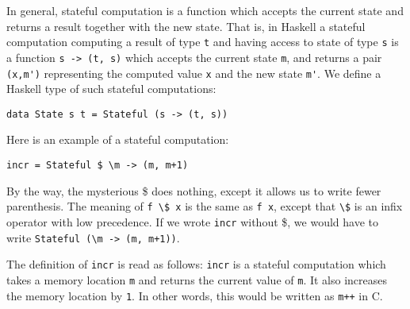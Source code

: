 \documentclass[a4paper,10pt]{article}
\newcommand{\cc}[1]{\lstinline{#1}}
\begin{document}
In general, stateful computation is a function which accepts the current state
and returns a result together with the new state. That is, in Haskell a
stateful computation computing a result of type \cc{t} and having access to
state of type \cc{s} is a function \cc{s -> (t, s)} which accepts the current
state \cc{m}, and returns a pair \cc{(x,m')} representing the computed value
\cc{x} and the new state \cc{m'}.
% 
We define a Haskell type of such stateful computations:
% 
\begin{lstlisting}
data State s t = Stateful (s -> (t, s))  
\end{lstlisting}
% 
Here is an example of a stateful computation:
% 
\begin{lstlisting}
incr = Stateful $ \m -> (m, m+1)  
\end{lstlisting}
By the way, the mysterious \$ does nothing, except it allows us to write fewer
parenthesis. The meaning of \cc{f \$ x} is the same as \cc{f x}, except that
\cc{\$} is an infix operator with low precedence. If we wrote \cc{incr}
without \$, we would have to write \cc{Stateful (\m -> (m, m+1))}.

The definition of \cc{incr} is read as follows: \cc{incr} is a stateful
computation which takes a memory location \cc{m} and returns the current value
of \cc{m}. It also increases the memory location by \cc{1}. In other words,
this would be written as \cc{m++} in C.
\end{document}
